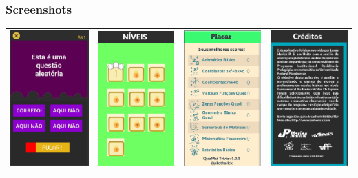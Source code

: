 \documentclass[10pt]{beamer}
\begin{document}

\begin{frame}
\frametitle{Screenshots}
\begin{tabular}{cccc}
		\includegraphics[width=0.22\linewidth]{questao_random.PNG}  &
		\includegraphics[width=0.22\linewidth]{challenge_levels.png}  &
		\includegraphics[width=0.22\linewidth]{scores_quest.PNG}  &
		\includegraphics[width=0.22\linewidth]{credits_quest.PNG}    
\end{tabular} 




\end{frame}
\end{document}
